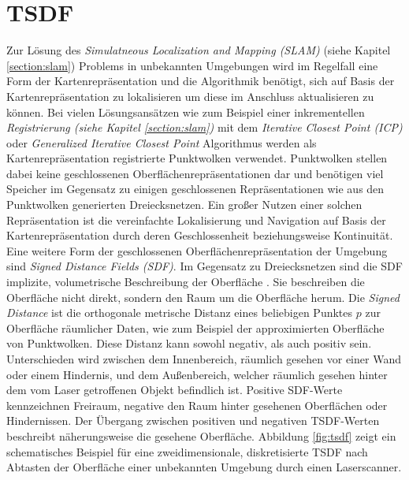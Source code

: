 \section{TSDF}
\label{section:tsdf}

Zur Lösung des \emph{Simulatneous Localization and Mapping (SLAM)} (siehe Kapitel \ref{section:slam}) Problems in unbekannten Umgebungen wird im Regelfall eine Form der Kartenrepräsentation und die Algorithmik benötigt, sich auf Basis der Kartenrepräsentation zu lokalisieren um diese im Anschluss aktualisieren zu können. Bei vielen Lösungsansätzen wie zum Beispiel einer inkrementellen \emph{Registrierung (siehe Kapitel \ref{section:slam})} mit dem \emph{Iterative Closest Point (ICP)} \cite{Besl:1992} oder \emph{Generalized Iterative Closest Point} \cite{segal2009generalized} Algorithmus werden als Kartenrepräsentation registrierte Punktwolken verwendet. Punktwolken stellen dabei keine geschlossenen Oberflächenrepräsentationen dar und benötigen viel Speicher im Gegensatz zu einigen geschlossenen Repräsentationen wie aus den Punktwolken generierten Dreiecksnetzen. Ein großer Nutzen einer solchen Repräsentation ist die vereinfachte Lokalisierung und Navigation auf Basis der Kartenrepräsentation durch deren Geschlossenheit beziehungsweise Kontinuität. Eine weitere Form der geschlossenen Oberflächenrepräsentation der Umgebung sind \emph{Signed Distance Fields (SDF)}. Im Gegensatz zu Dreiecksnetzen sind die SDF implizite, volumetrische Beschreibung der Oberfläche \cite{werner2014truncated}. Sie beschreiben die Oberfläche nicht direkt, sondern den Raum um die Oberfläche herum. Die \emph{Signed Distance} ist die orthogonale metrische Distanz eines beliebigen Punktes $p$ zur Oberfläche räumlicher Daten, wie zum Beispiel der approximierten Oberfläche von Punktwolken. Diese Distanz kann sowohl negativ, als auch positiv sein. Unterschieden wird zwischen dem Innenbereich, räumlich gesehen vor einer Wand oder einem Hindernis, und dem Außenbereich, welcher räumlich gesehen hinter dem vom Laser getroffenen Objekt befindlich ist. Positive SDF-Werte kennzeichnen Freiraum, negative den Raum hinter gesehenen Oberflächen oder Hindernissen. Der Übergang zwischen positiven und negativen TSDF-Werten beschreibt näherungsweise die gesehene Oberfläche.
Abbildung \ref{fig:tsdf} zeigt ein schematisches Beispiel für eine zweidimensionale, diskretisierte TSDF nach Abtasten der Oberfläche einer unbekannten Umgebung durch einen Laserscanner.

